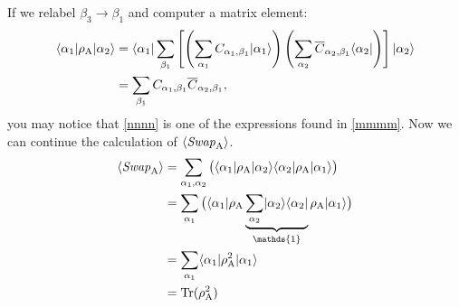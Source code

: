 If we relabel $\beta_3 \rightarrow \beta_1$ and computer a matrix element:
\begin{align}
	\langle {\alpha_1} \rvert\rho_{\rm A} \lvert {\alpha_2} \rangle
	&=   \langle {\alpha_1} \rvert\sum_{\beta_1}  \left[ \left(\sum_{\alpha_1} 
		C_{\alpha_1,\beta_1}\lvert {\alpha_1} \rangle\right)
		\left(\sum_{\alpha_2} 
		\overline{C}_{\alpha_2,\beta_1}\langle {\alpha_2} \rvert\right) \right] \lvert {\alpha_2} \rangle \\
	&= \sum_{\beta_1} C_{\alpha_1,\beta_1} \overline{C}_{\alpha_2,\beta_1} \label{nnnn},
\end{align}
you may notice that \eqref{nnnn} is one of the expressions found in \eqref{mmmm}.
Now we can continue the calculation of $\langle {\it Swap}_{\rm A} \rangle$.
\begin{align}
\langle \SWA \rangle &= \sum_{\alpha_1,\alpha_2} \big( \bra{\alpha_1}\rho_{\rm A} \ket{\alpha_2} 
					\bra{\alpha_2}\rho_{\rm A} \ket{\alpha_1}\big) \\
	&= \sum_{\alpha_1} \big( \bra{\alpha_1}\rho_{\rm A} 
				\underbrace{\sum_{\alpha_2} \ket{\alpha_2}\bra{\alpha_2}}_{\mathds{1}}
				\rho_{\rm A} \ket{\alpha_1}\big) \\
	&= \sum_{\alpha_1} \bra{\alpha_1}\rho_{\rm A}^2  \ket{\alpha_1} \\
	&= {\rm Tr (\rho_A^2)}
\end{align}

